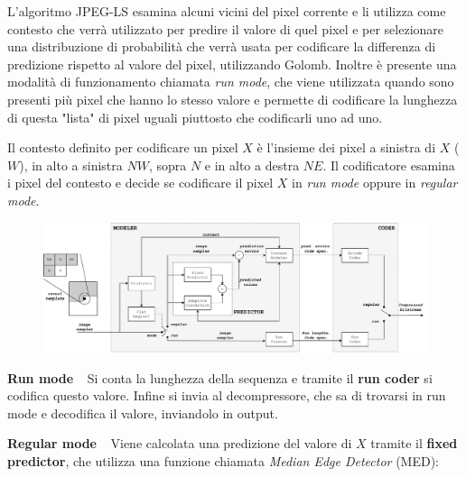 \vspace{5mm}

L'algoritmo JPEG-LS esamina alcuni vicini del pixel corrente e li utilizza come contesto che verrà utilizzato per predire il valore di quel pixel e per selezionare una distribuzione di probabilità che verrà usata per codificare la differenza di predizione rispetto al valore del pixel, utilizzando Golomb. Inoltre è presente una modalità di funzionamento chiamata \textit{run mode}, che viene utilizzata quando sono presenti più pixel che hanno lo stesso valore e permette di codificare la lunghezza di questa "lista" di pixel uguali piuttosto che codificarli uno ad uno.

Il contesto definito per codificare un pixel \(X\) è l'insieme dei pixel a sinistra di \(X\) (\(W\)), in alto a sinistra \(NW\), sopra \(N\) e in alto a destra \(NE\). Il codificatore esamina i pixel del contesto e decide se codificare il pixel \(X\) in \textit{run mode} oppure in \textit{regular mode}.

\vspace{4mm}

\begin{figure}[htbp!]
\centering
\includegraphics[width=\textwidth]{Images/5.3.pdf}
\end{figure}
\FloatBarrier

\vspace{4mm}

%  

\textbf{Run mode} \(\>\>\) Si conta la lunghezza della sequenza e tramite il \textbf{run coder} si codifica questo valore. Infine si invia al decompressore, che sa di trovarsi in run mode e decodifica il valore, inviandolo in output.

\textbf{Regular mode} \(\>\>\) Viene calcolata una predizione del valore di \(X\) tramite il \textbf{fixed predictor}, che utilizza una funzione chiamata \textit{Median Edge Detector} (MED):

